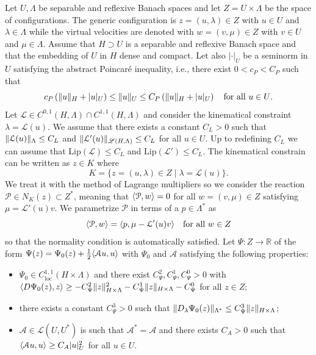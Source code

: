 \documentclass[a4paper,10pt,oneside]{amsbook}
\numberwithin{section}{chapter}
\numberwithin{equation}{chapter}
\theoremstyle{definition}
\DeclarePairedDelimiter{\norm}{\lVert}{\rVert}
\DeclarePairedDelimiter{\dual}{\langle}{\rangle}
\begin{document}
Let $U,\Lambda$ be separable and reflexive Banach spaces and let $Z=U\times\Lambda$ be the space of configurations. The generic configuration is $z=(u,\lambda)\in Z$ with $u\in U$ and $\lambda\in\Lambda$ while the virtual velocities are denoted with $w=(v,\mu)\in Z$ with $v\in U$ and $\mu\in\Lambda$. Assume that $H\supset U$ is a separable and reflexive Banach space and that the embedding of $U$ in $H$ dense and compact. Let also $|\cdot|_U$ be a seminorm in $U$ satisfying the abstract Poincaré inequality, i.e., there exist $0<c_P<C_P$ such that
\begin{equation}
\label{eqn:abstract-poincare}
c_P\left(\norm{u}_H+|u|_U\right)\le\norm{u}_U\le C_P\left(\norm{u}_H+|u|_U\right)\quad\text{for all $u\in U$.}
\end{equation}
Let $\mathcal{L}\in C^{0,1}(H,\Lambda)\cap C^{1,1}(H,\Lambda)$ and consider the kinematical constraint $\lambda=\mathcal{L}(u)$. We assume that there exists a constant $C_L>0$ such that $\norm{\mathcal{L}(u)}_\Lambda\le C_L$ and $\norm{\mathcal{L}'(u)}_{\mathscr{L}(H,\Lambda)}\le C_L$ for all $u\in U$. Up to redefining $C_L$ we can assume that $\text{Lip}(\mathcal{L})\le C_L$ and $\text{Lip}(\mathcal{L}')\le C_L$. The kinematical constrain can be written as $z\in K$ where
\[
K=\{z=(u,\lambda)\in Z\;|\;\lambda=\mathcal{L}(u)\}.
\]
We treat it with the method of Lagrange multipliers so we consider the reaction $\mathcal{P}\in N_K(z)\subset Z^*$, meaning that $\dual{\mathcal{P},w}=0$ for all $w=(v,\mu)\in Z$ satisfying $\mu=\mathcal{L}'(u)v$. We parametrize $\mathcal{P}$ in terms of a $p\in\Lambda^*$ as
\[
\dual{\mathcal{P},w}=\dual{p,\mu-\mathcal{L}'(u)v}\quad\text{for all $w\in Z$}
\]
so that the normality condition is automatically satisfied. Let $\Psi\colon Z\to\mathbb{R}$ of the form $\Psi(z)=\Psi_0(z)+\frac{1}{2}\dual{\mathcal{A}u,u}$ with $\Psi_0$ and $\mathcal{A}$ satisfying the following properties:
\begin{itemize}
\item[($\Psi$1)] $\Psi_0\in C^{1,1}_\text{loc}(H\times\Lambda)$ and there exist $C_\Psi^2,C^1_\Psi,C^0_\Psi>0$ with $\dual{D\Psi_0(z),z}\ge-C_\Psi^2\norm{z}_{H\times\Lambda}^2-C_\Psi^1\norm{z}_{H\times\Lambda}-C_\Psi^0$ for all $z\in Z$;
\item[($\Psi$2)] there exists a constant $C_\Psi^3>0$ such that $\norm{D_\lambda\Psi_0(z)}_{\Lambda^*}\le C_\Psi^3\norm{z}_{H\times\Lambda}$;
\item[(A)] $\mathcal{A}\in\mathscr{L}(U,U^*)$ is such that $\mathcal{A}^*=\mathcal{A}$ and there exists $C_A>0$ such that $\dual{\mathcal{A}u,u}\ge C_A|u|_U^2$ for all $u\in U$.
\end{itemize}
\end{document}
